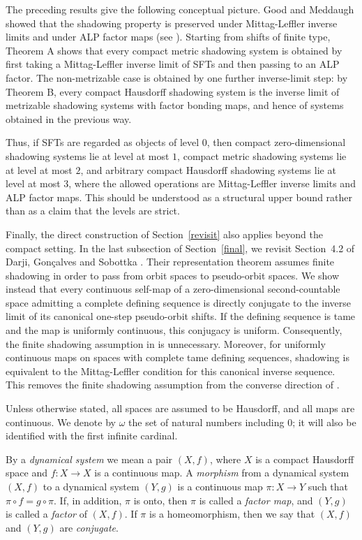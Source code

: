 \documentclass[12pt]{amsart}
\theoremstyle{definition}
\numberwithin{equation}{section}
\theoremstyle{remark}
\begin{document}
The preceding results give the following conceptual picture. Good and
Meddaugh showed that the shadowing property is preserved under
Mittag-Leffler inverse limits and under ALP factor
maps (see \cite[Section 5]{GM}). Starting from shifts of finite type, Theorem A shows that
every compact metric shadowing system is obtained by first taking a
Mittag-Leffler inverse limit of SFTs and then passing to an ALP factor. The
non-metrizable case is obtained by one further inverse-limit step: by Theorem
B, every compact Hausdorff shadowing system is the inverse limit of
metrizable shadowing systems with factor bonding maps, and hence of systems
obtained in the previous way.

Thus, if SFTs are regarded as objects of level $0$, then compact
zero-dimensional shadowing systems lie at level at most $1$, compact metric
shadowing systems lie at level at most $2$, and arbitrary compact Hausdorff
shadowing systems lie at level at most $3$, where the allowed operations are
Mittag-Leffler inverse limits and ALP factor maps. This should be understood as
a structural upper bound rather than as a claim that the levels are strict.

Finally, the direct construction of Section~\ref{revisit} also applies beyond
the compact setting. In the last subsection of Section~\ref{final}, we
revisit Section~4.2 of Darji, Gon\c{c}alves and Sobottka \cite{Darji}.
Their representation theorem assumes finite shadowing in order to pass from
orbit spaces to pseudo-orbit spaces. We show instead that every continuous
self-map of a zero-dimensional second-countable space admitting a complete
defining sequence is directly conjugate to the inverse limit of its canonical
one-step pseudo-orbit shifts. If the defining sequence is tame and the map is
uniformly continuous, this conjugacy is uniform. Consequently, the finite
shadowing assumption in \cite[Theorem~4.2.8]{Darji} is unnecessary.
Moreover, for uniformly continuous maps on spaces with complete tame defining
sequences, shadowing is equivalent to the Mittag-Leffler condition for this
canonical inverse sequence. This removes the finite shadowing assumption from
the converse direction of \cite[Theorem~4.2.9(ii)]{Darji}.


Unless otherwise stated, all spaces are assumed to be Hausdorff, and all maps are
continuous.
We denote by $\omega$ the set of natural numbers including $0$; it will also be
identified with the first infinite cardinal. 

By a \emph{dynamical system} we
mean a pair $(X,f)$, where $X$ is a compact Hausdorff space and
$f:X\to X$ is a continuous map.
A \emph{morphism} from a dynamical system $(X,f)$ to a dynamical system
$(Y,g)$ is a continuous map $\pi:X\to Y$ such that $\pi\circ f=g\circ \pi$.
If, in addition, $\pi$ is onto, then $\pi$ is called a \emph{factor map}, and
$(Y,g)$ is called a \emph{factor} of $(X,f)$. If $\pi$ is a homeomorphism, then
we say that $(X,f)$ and $(Y,g)$ are \emph{conjugate}.
\end{document}
